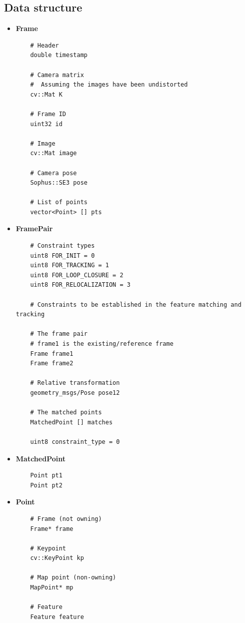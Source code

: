 \subsection{Data structure}

\begin{itemize}
  \item \textbf{Frame}
  \begin{verbatim}
    # Header
    double timestamp

    # Camera matrix
    #  Assuming the images have been undistorted
    cv::Mat K

    # Frame ID
    uint32 id 

    # Image
    cv::Mat image
    
    # Camera pose
    Sophus::SE3 pose
    
    # List of points
    vector<Point> [] pts
  \end{verbatim}

  \item \textbf{FramePair}
  \begin{verbatim}
    # Constraint types
    uint8 FOR_INIT = 0
    uint8 FOR_TRACKING = 1
    uint8 FOR_LOOP_CLOSURE = 2
    uint8 FOR_RELOCALIZATION = 3

    # Constraints to be established in the feature matching and tracking 

    # The frame pair
    # frame1 is the existing/reference frame
    Frame frame1
    Frame frame2

    # Relative transformation
    geometry_msgs/Pose pose12

    # The matched points
    MatchedPoint [] matches

    uint8 constraint_type = 0
  \end{verbatim}

  \item \textbf{MatchedPoint}
  \begin{verbatim}
    Point pt1    
    Point pt2
  \end{verbatim}

  \item \textbf{Point}
  \begin{verbatim}
    # Frame (not owning)
    Frame* frame
    
    # Keypoint
    cv::KeyPoint kp

    # Map point (non-owning)
    MapPoint* mp
    
    # Feature
    Feature feature    
  \end{verbatim}


\end{itemize}
